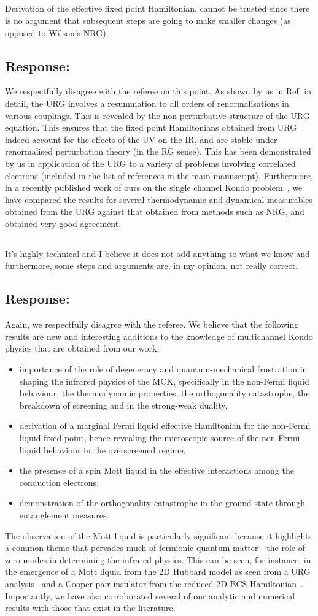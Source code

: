 \documentclass{article}
\newcommand{\response}[1]{{\color{blue}\subsection*{Response:}{#1}}}
\newcommand{\point}[1]{\subsection{}{#1}}
\begin{document}
\point{
Derivation of the effective fixed
point Hamiltonian, cannot be trusted since there is no argument that
subsequent steps are going to make smaller changes (as opposed to
Wilson’s NRG).
}

\response{
We respectfully disagree with the referee on this point. As shown by us in Ref.\cite{anirbanurg1} in detail, the URG involves a resummation to all orders of renormalisations in various couplings. This is revealed by the non-perturbative structure of the URG equation. This ensures that the fixed point Hamiltonians obtained from URG indeed account for the effects of the UV on the IR, and are stable under renormalised perturbation theory (in the RG sense). This has been demonstrated by us in application of the URG to a variety of problems involving correlated electrons (included in the list of references in the main manuscript). Furthermore, in a recently published work of ours on the single channel Kondo problem~\cite{kondo_urg}, we have compared the results for several thermodynamic and dynamical measurables obtained from the URG against that obtained from methods such as NRG, and obtained very good agreement. 
}

\point{
It’s highly
technical and I believe it does not add anything to what we know and
furthermore, some steps and arguments are, in my opinion, not really
correct.
}

\response{
Again, we respectfully disagree with the referee. We believe that the following results are new and interesting additions to the knowledge of multichannel Kondo physics that are obtained from our work:
\begin{itemize}
	\item importance of the role of degeneracy and quantum-mechanical frustration in shaping the infrared physics of the MCK, specifically in the non-Fermi liquid behaviour, the thermodynamic properties, the orthogonality catastrophe, the breakdown of screening and in the strong-weak duality,
	\item derivation of a marginal Fermi liquid effective Hamiltonian for the non-Fermi liquid fixed point, hence revealing the microscopic source of the non-Fermi liquid behaviour in the overscreened regime,
	\item the presence of a spin Mott liquid in the effective interactions among the conduction electrons,
	\item demonstration of the orthogonality catastrophe in the ground state through entanglement measures.
\end{itemize}
The observation of the Mott liquid is particularly significant because it highlights a common theme that pervades much of fermionic quantum matter - the role of zero modes in determining the infrared physics. This can be seen, for instance, in the emergence of a Mott liquid from the 2D Hubbard model as seen from a URG analysis~\cite{anirbanmott1,anirbanmott2,mukherjeeMERG2022} and a Cooper pair insulator from the reduced 2D BCS Hamiltonian~\cite{siddharthacpi}. Importantly, we have also corroborated several of our analytic and numerical results with those that exist in the literature.
}
\end{document}
